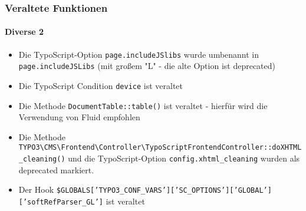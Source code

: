 \begin{frame}[fragile]
	\frametitle{Veraltete Funktionen}
	\framesubtitle{Diverse 2}

	\begin{itemize}
		\item Die TypoScript-Option \texttt{page.includeJSlibs} wurde umbenannt in \texttt{page.includeJSLibs} (mit großem "L" - die alte Option ist deprecated)

		\item Die TypoScript Condition \texttt{device} ist veraltet

		\item Die Methode \texttt{DocumentTable::table()} ist veraltet - hierfür wird die Verwendung von Fluid empfohlen

		\item Die Methode \lstinline{TYPO3\CMS\Frontend\Controller\TypoScriptFrontendController::doXHTML_cleaning()} und die TypoScript-Option \texttt{config.xhtml\_cleaning} wurden als deprecated markiert.

		\item Der Hook \texttt{\$GLOBALS['TYPO3\_CONF\_VARS']['SC\_OPTIONS']['GLOBAL']['softRefParser\_GL']} ist veraltet
 
	\end{itemize}

\end{frame}


